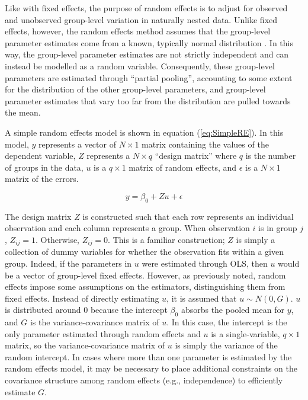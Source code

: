 \documentclass[12pt]{article}
\begin{document}
Like with fixed effects, the purpose of random effects is to adjust for observed and unobserved group-level variation in naturally nested data. Unlike fixed effects, however, the random effects method assumes that the group-level parameter estimates come from a known, typically normal distribution \citep{puntanenEqualityOrdinaryLeast1989}. In this way, the group-level parameter estimates are not strictly independent and can instead be modelled as a random variable. Consequently, these group-level parameters are estimated through ``partial pooling'', accounting to some extent for the distribution of the other group-level parameters, and group-level parameter estimates that vary too far from the distribution are pulled towards the mean.

A simple random effects model is shown in equation (\ref{eq:SimpleRE}). In this model, $y$ represents a vector of $N \times 1$ matrix containing the values of the dependent variable, $Z$ represents a $N \times q$ ``design matrix'' where $q$ is the number of groups in the data, $u$ is a $q \times 1$ matrix of random effects, and $\epsilon$ is a $N \times 1$ matrix of the errors.

\begin{equation}\label{eq:SimpleRE}
  y = \beta_0 + Zu + \epsilon
\end{equation}

The design matrix $Z$ is constructed such that each row represents an individual observation and each column represents a group. When observation $i$ is in group $j$, $Z_{ij}=1$. Otherwise, $Z_{ij}=0$. This is a familiar construction; $Z$ is simply a collection of dummy variables for whether the observation fits within a given group. Indeed, if the parameters in $u$ were estimated through OLS, then $u$ would be a vector of group-level fixed effects. However, as previously noted, random effects impose some assumptions on the estimators, distinguishing them from fixed effects. Instead of directly estimating $u$, it is assumed that $u \sim N(0, G)$. $u$ is distributed around $0$ because the intercept $\beta_0$ absorbs the pooled mean for $y$, and $G$ is the variance-covariance matrix of $u$. In this case, the intercept is the only parameter estimated through random effects and $u$ is a single-variable, $q \times 1$ matrix, so the variance-covariance matrix of $u$ is simply the variance of the random intercept. In cases where more than one parameter is estimated by the random effects model, it may be necessary to place additional constraints on the covariance structure among random effects (e.g., independence) to efficiently estimate $G$.
\end{document}
